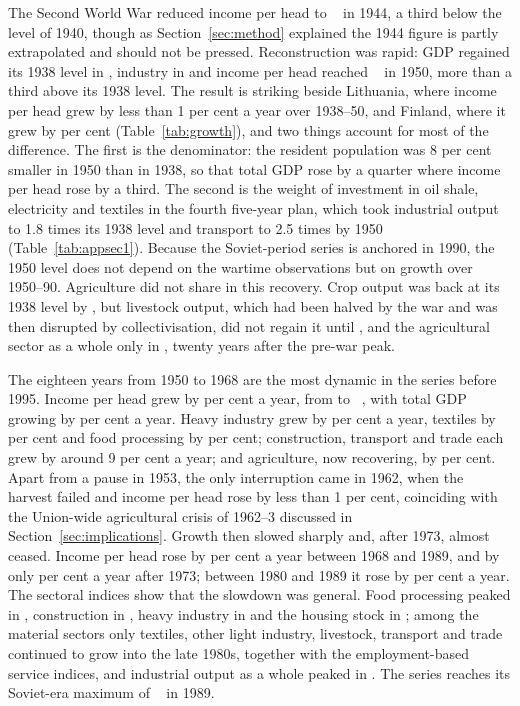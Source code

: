 The Second World War reduced income per head to ~\intlnineteen{} in 1944, a third below the level of 1940, though as Section~\ref{sec:method} explained the 1944 figure is partly extrapolated and should not be pressed. Reconstruction was rapid: GDP regained its 1938 level in , industry in  and income per head reached ~\intlnineteen{} in 1950, more than a third above its 1938 level. The result is striking beside Lithuania, where income per head grew by less than 1 per cent a year over 1938--50, and Finland, where it grew by  per cent (Table~\ref{tab:growth}), and two things account for most of the difference. The first is the denominator: the resident population was 8 per cent smaller in 1950 than in 1938, so that total GDP rose by a quarter where income per head rose by a third. The second is the weight of investment in oil shale, electricity and textiles in the fourth five-year plan, which took industrial output to 1.8 times its 1938 level and transport to 2.5 times by 1950 (Table~\ref{tab:appsec1}). Because the Soviet-period series is anchored in 1990, the 1950 level does not depend on the wartime observations but on growth over 1950--90. Agriculture did not share in this recovery. Crop output was back at its 1938 level by , but livestock output, which had been halved by the war and was then disrupted by collectivisation, did not regain it until , and the agricultural sector as a whole only in , twenty years after the pre-war peak.

The eighteen years from 1950 to 1968 are the most dynamic in the series before 1995. Income per head grew by  per cent a year, from  to ~\intlnineteen{}, with total GDP growing by  per cent a year. Heavy industry grew by  per cent a year, textiles by  per cent and food processing by  per cent; construction, transport and trade each grew by around 9 per cent a year; and agriculture, now recovering, by  per cent. Apart from a pause in 1953, the only interruption came in 1962, when the harvest failed and income per head rose by less than 1 per cent, coinciding with the Union-wide agricultural crisis of 1962--3 discussed in Section~\ref{sec:implications}. Growth then slowed sharply and, after 1973, almost ceased. Income per head rose by  per cent a year between 1968 and 1989, and by only  per cent a year after 1973; between 1980 and 1989 it rose by  per cent a year. The sectoral indices show that the slowdown was general. Food processing peaked in , construction in , heavy industry in  and the housing stock in ; among the material sectors only textiles, other light industry, livestock, transport and trade continued to grow into the late 1980s, together with the employment-based service indices, and industrial output as a whole peaked in . The series reaches its Soviet-era maximum of ~\intlnineteen{} in 1989.

